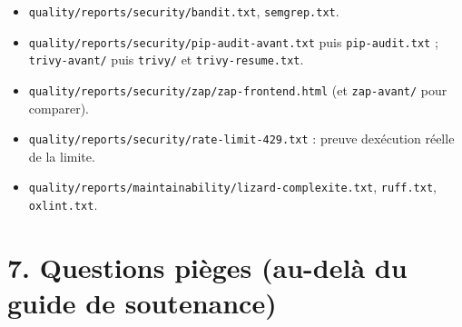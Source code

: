\documentclass[
  11pt,
]{article}
\providecommand{\tightlist}{%
  \setlength{\itemsep}{0pt}\setlength{\parskip}{0pt}}
\begin{document}
\begin{itemize}
\tightlist
\item
  \texttt{quality/}\allowbreak{}\texttt{reports/}\allowbreak{}\texttt{security/}\allowbreak{}\texttt{bandit.}\allowbreak{}\texttt{txt},
  \texttt{semgrep.txt}.
\item
  \texttt{quality/}\allowbreak{}\texttt{reports/}\allowbreak{}\texttt{security/}\allowbreak{}\texttt{pip-}\allowbreak{}\texttt{audit-}\allowbreak{}\texttt{avant.}\allowbreak{}\texttt{txt}
  puis \texttt{pip-audit.txt} ; \texttt{trivy-avant/} puis
  \texttt{trivy/} et \texttt{trivy-resume.txt}.
\item
  \texttt{quality/}\allowbreak{}\texttt{reports/}\allowbreak{}\texttt{security/}\allowbreak{}\texttt{zap/}\allowbreak{}\texttt{zap-}\allowbreak{}\texttt{frontend.}\allowbreak{}\texttt{html}
  (et \texttt{zap-avant/} pour comparer).
\item
  \texttt{quality/}\allowbreak{}\texttt{reports/}\allowbreak{}\texttt{security/}\allowbreak{}\texttt{rate-}\allowbreak{}\texttt{limit-}\allowbreak{}\texttt{429.}\allowbreak{}\texttt{txt}
  : preuve d\textquotesingle exécution réelle de la limite.
\item
  \texttt{quality/}\allowbreak{}\texttt{reports/}\allowbreak{}\texttt{maintainability/}\allowbreak{}\texttt{lizard-}\allowbreak{}\texttt{complexite.}\allowbreak{}\texttt{txt},
  \texttt{ruff.txt}, \texttt{oxlint.txt}.
\end{itemize}

\section{7. Questions pièges (au-delà du guide de
soutenance)}\label{7-questions-piuxe8ges-au-deluxe0-du-guide-de-soutenance}
\end{document}
